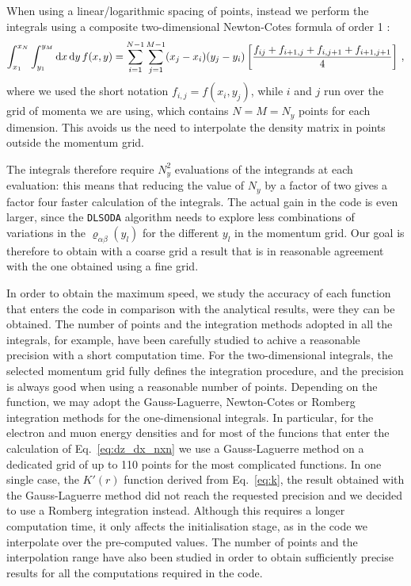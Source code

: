 \documentclass[notitlepage,showpacs,preprintnumbers,amsmath,amssymb,superscriptaddress,prd,onecolumn]{revtex4-1}
\begin{document}
When using a linear/logarithmic spacing of points, instead
we perform the integrals using a composite two-dimensional Newton-Cotes formula of order 1 \cite{newtoncotes}:
\begin{equation}
\int_{x_1}^{x_N}\int_{y_1}^{y_M}{\rm d}x\, {\rm d}y\, f(x, y)
=
\sum_{i=1}^{N-1}\sum_{j=1}^{M-1}
(x_j-x_i)(y_j-y_i)
\left[\frac{f_{ij} + f_{i+1,j} + f_{i,j+1} + f_{i+1,j+1}}{4}\right]\,,
\end{equation}
where we used the short notation $f_{i,j} = f(x_i,y_j)$,
while $i$ and $j$ run over the grid of momenta we are using,
which contains $N=M=N_y$ points for each dimension.
This avoids us the need to interpolate the density matrix in points outside the momentum grid.

The integrals therefore require $N_y^2$ evaluations of the integrands at each evaluation:
this means that reducing the value of $N_y$ by a factor of two
gives a factor four faster calculation of the integrals.
The actual gain in the code is even larger, since the \texttt{DLSODA} algorithm needs to explore less combinations
of variations in the $\varrho_{\alpha\beta}(y_l)$ for the different $y_l$ in the momentum grid.
Our goal is therefore to obtain with a coarse grid
a result that is in reasonable agreement with the one obtained using a fine grid.

In order to obtain the maximum speed,
we study the accuracy of each function that enters the code in comparison
with the analytical results, were they can be obtained.
The number of points and the integration methods adopted in all the integrals,
for example, have been carefully studied to achive a reasonable precision
with a short computation time.
For the two-dimensional integrals, the selected momentum grid
fully defines the integration procedure, and the precision is always good
when using a reasonable number of points.
Depending on the function, we may adopt the Gauss-Laguerre, Newton-Cotes or Romberg integration \cite{Romberg:1955}
methods for the one-dimensional integrals.
In particular, for the electron and muon energy densities
and for most of the funcions that enter the calculation of Eq.~\eqref{eq:dz_dx_nxn}
we use a Gauss-Laguerre method on a dedicated grid of up to 110 points
for the most complicated functions.
In one single case, the $K'(r)$ function derived from Eq.~\eqref{eq:k},
the result obtained with the Gauss-Laguerre method
did not reach the requested precision and we decided to use a Romberg integration instead.
Although this requires a longer computation time, it only affects the initialisation stage,
as in the code we interpolate over the pre-computed values.
The number of points and the interpolation range have also been studied in order to obtain sufficiently precise results
for all the computations required in the code.
\end{document}
